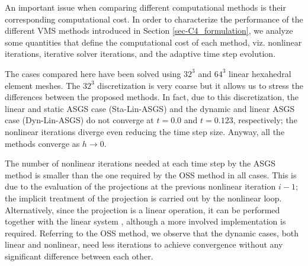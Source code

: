 An important issue when comparing different computational methods is their corresponding computational cost. In order to characterize the performance of the different VMS methods introduced in Section \ref{sec-C4_formulation},  we analyze  some quantities that define the computational cost of each method, viz. nonlinear iterations, iterative solver iterations, and the adaptive time step evolution.


The cases compared here have been solved using $32^3$ and $64^3$ linear hexahedral element meshes. The $32^3$ discretization is very coarse but it allows us to stress the differences between the proposed methods. In fact, due to this discretization, the linear and static ASGS case (Sta-Lin-ASGS) and the dynamic and linear ASGS case (Dyn-Lin-ASGS) do not converge at $t=0.0$ and  $t=0.123$, respectively; the nonlinear iterations diverge even reducing the time step size. Anyway, all the methods converge as $h\rightarrow0$.


The number of nonlinear iterations needed at each time step by the ASGS method is smaller than the one required by the OSS method in all cases. This is due to the evaluation of the projections at the previous nonlinear iteration $i-1$; the implicit treatment of the projection is carried out by the nonlinear loop. Alternatively, since the projection is a linear operation, it can be performed together with the linear system \cite{Codina_2008a}, although a more involved implementation is required. Referring to the OSS method, we observe that the dynamic cases, both linear and nonlinear, need less iterations to achieve convergence without any significant difference between each other.

